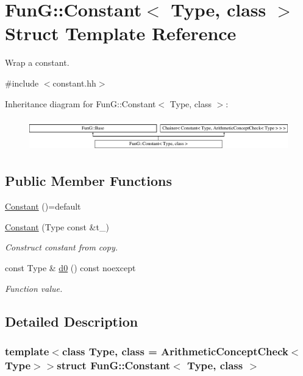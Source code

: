 \hypertarget{structFunG_1_1Constant}{}\section{Fun\+G\+:\+:Constant$<$ Type, class $>$ Struct Template Reference}
\label{structFunG_1_1Constant}


Wrap a constant.  




{\ttfamily \#include $<$constant.\+hh$>$}

Inheritance diagram for Fun\+G\+:\+:Constant$<$ Type, class $>$\+:\begin{figure}[H]
\begin{center}
\leavevmode
\includegraphics[height=1.435897cm]{structFunG_1_1Constant}
\end{center}
\end{figure}
\subsection*{Public Member Functions}
\begin{DoxyCompactItemize}
\item 
\hyperlink{structFunG_1_1Constant_a29ead8431e2fadfef397aae5dc5a4511}{Constant} ()=default
\item 
\hyperlink{structFunG_1_1Constant_a310783597f488e554de12627bf56aec8}{Constant} (Type const \&t\+\_\+)
\begin{DoxyCompactList}\small\item\em Construct constant from copy. \end{DoxyCompactList}\item 
const Type \& \hyperlink{structFunG_1_1Constant_aad514a9470fbe1c47c0f07da6e160416}{d0} () const noexcept
\begin{DoxyCompactList}\small\item\em Function value. \end{DoxyCompactList}\end{DoxyCompactItemize}


\subsection{Detailed Description}
\subsubsection*{template$<$class Type, class = Arithmetic\+Concept\+Check$<$\+Type$>$$>$struct Fun\+G\+::\+Constant$<$ Type, class $>$}

